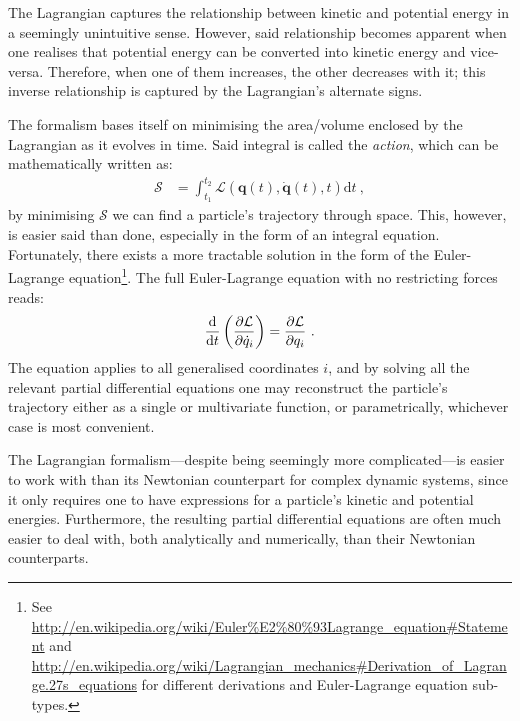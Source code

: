 The Lagrangian captures the relationship between kinetic and potential energy in a seemingly unintuitive sense. However, said relationship becomes apparent when one realises that potential energy can be converted into kinetic energy and vice-versa. Therefore, when one of them increases, the other decreases with it; this inverse relationship is captured by the Lagrangian's alternate signs.

The formalism bases itself on minimising the area/volume enclosed by the Lagrangian as it evolves in time. Said integral is called the \emph{action}, which can be mathematically written as:
\begin{align}\label{eq:action}
\mathcal{S} &= \int_{t_1}^{t_2} \mathcal{L}(\bm{q}(t), \dot{\bm{q}}(t), t) \textrm{d}t~,
\end{align}
by minimising $ \mathcal{S} $ we can find a particle's trajectory through space. This, however, is easier said than done, especially in the form of an integral equation. Fortunately, there exists a more tractable solution in the form of the Euler-Lagrange equation\footnote{See \url{http://en.wikipedia.org/wiki/Euler\%E2\%80\%93Lagrange\_equation\#Statement} and \url{http://en.wikipedia.org/wiki/Lagrangian\_mechanics\#Derivation\_of\_Lagrange.27s\_equations} for different derivations and Euler-Lagrange equation sub-types.}. The full Euler-Lagrange equation with no restricting forces reads:
\begin{align}\label{eq:el}
\frac{\textrm{d} }{\textrm{d} t}\left(\frac{\partial \mathcal{L}}{\partial \dot{q}_{i}}\right) = \frac{\partial \mathcal{L}}{\partial q_{i}}~.
\end{align}
The equation applies to all generalised coordinates $ i $, and by solving all the relevant partial differential equations one may reconstruct the particle's trajectory either as a single or multivariate function, or parametrically, whichever case is most convenient.

The Lagrangian formalism---despite being seemingly more complicated---is easier to work with than its Newtonian counterpart for complex dynamic systems, since it only requires one to have expressions for a particle's kinetic and potential energies. Furthermore, the resulting partial differential equations are often much easier to deal with, both analytically and numerically, than their Newtonian counterparts.
%
